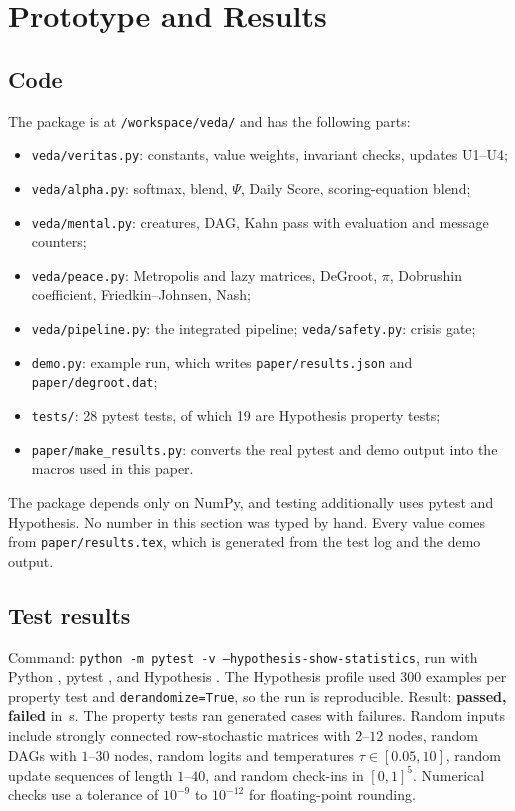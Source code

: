 \documentclass[11pt]{article}
\theoremstyle{definition}
\theoremstyle{remark}
\begin{document}
\section{Prototype and Results}\label{sec:prototype}
\subsection{Code}
The package is at \texttt{/workspace/veda/} and has the following parts:
\begin{itemize}
\item \texttt{veda/veritas.py}: constants, value weights, invariant checks, updates U1--U4;
\item \texttt{veda/alpha.py}: softmax, blend, $\Psi$, Daily Score, scoring-equation blend;
\item \texttt{veda/mental.py}: creatures, DAG, Kahn pass with evaluation and message counters;
\item \texttt{veda/peace.py}: Metropolis and lazy matrices, DeGroot, $\pi$, Dobrushin coefficient, Friedkin--Johnsen, Nash;
\item \texttt{veda/pipeline.py}: the integrated pipeline; \texttt{veda/safety.py}: crisis gate;
\item \texttt{demo.py}: example run, which writes \texttt{paper/results.json} and \texttt{paper/degroot.dat};
\item \texttt{tests/}: 28 pytest tests, of which 19 are Hypothesis property tests;
\item \texttt{paper/make\_results.py}: converts the real pytest and demo output into the macros used in this paper.
\end{itemize}
The package depends only on NumPy, and testing additionally uses pytest and Hypothesis. No number in this section was typed by hand. Every value comes from \texttt{paper/results.tex}, which is generated from the test log and the demo output.

\subsection{Test results}
Command: \texttt{python -m pytest -v --hypothesis-show-statistics}, run with Python \PyVer, pytest \PytestVer, and Hypothesis \HypVer. The Hypothesis profile used 300 examples per property test and \texttt{derandomize=True}, so the run is reproducible. Result: \textbf{\Npassed{} passed, \Nfailed{} failed} in \Ntime\,s. The \Nprop{} property tests ran \Ncases{} generated cases with \Ncasefail{} failures. Random inputs include strongly connected row-stochastic matrices with $2$--$12$ nodes, random DAGs with $1$--$30$ nodes, random logits and temperatures $\tau\in[0.05,10]$, random update sequences of length $1$--$40$, and random check-ins in $[0,1]^5$. Numerical checks use a tolerance of $10^{-9}$ to $10^{-12}$ for floating-point rounding.
\end{document}
